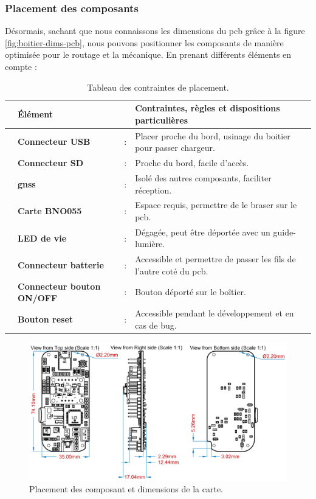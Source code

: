 \subsubsection{Placement des composants} \label{ssec:placementComp}
Désormais, sachant que nous connaissons les dimensions du \gls{pcb} grâce à la figure \ref{fig:boitier-dims-pcb}, nous pouvons positionner les composants de manière optimisée pour le routage et la mécanique. En prenant différents éléments en compte :

\begin{table}[!h]
\begin{adjustbox}{max width=\textwidth}
	\begin{tabular}{llll}
	\hline
	& Élément & & Contraintes, règles et dispositions particulières \\
	\hline
	\faChevronRight & \textbf{Connecteur USB} & : & Placer proche du bord, usinage du boitier pour passer chargeur. \\
	\faChevronRight & \textbf{Connecteur \micro SD} & : & Proche du bord, facile d'accès. \\
	\faChevronRight & \textbf{\gls{gnss}} & : & Isolé des autres composants, faciliter réception. \\
	\faChevronRight & \textbf{Carte BNO055} & : & Espace requis, permettre de le braser sur le \gls{pcb}. \\
	\faChevronRight & \textbf{LED de vie} & : & Dégagée, peut être déportée avec un guide-lumière. \\
	\faChevronRight & \textbf{Connecteur batterie} & : & Accessible et permettre de passer les fils de l'autre coté du \gls{pcb}. \\
	\faChevronRight & \textbf{Connecteur bouton ON/OFF} & : & Bouton déporté sur le boîtier. \\
	\faChevronRight & \textbf{Bouton reset} & : & Accessible pendant le développement et en cas de bug. \\
	\end{tabular}	
\end{adjustbox}
\caption{Tableau des contraintes de placement.}
\label{tab:reglesPlacement}
\end{table}

\clearpage

\begin{figure}[h]
	\centering
	\includegraphics[width=.83\linewidth]{../figures/dev-pcb/PCB-Dims}
	\caption{Placement des composant et dimensions de la carte.}
	\label{fig:pcb-dims}
\end{figure}

